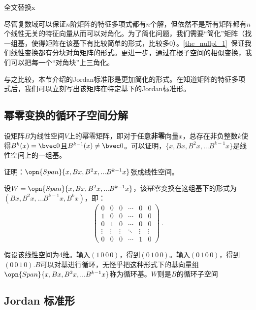 

\begin{issues}
\issueDraft 全文替换x
\end{issues}
尽管复数域可以保证$n$阶矩阵的特征多项式都有$n$个解，但依然不是所有矩阵都有$n$个线性无关的特征向量从而可以对角化。为了简化问题，我们需要“简化”矩阵（找一组基，使得矩阵在该基下有比较简单的形式，比较多$0$）。\autoref{the_nullpl_1}~保证我们线性变换都有分块对角矩阵的形式。更进一步，通过在根子空间的相似变换，我们可以把每一个“对角块”上三角化。

与之比较，本节介绍的Jordan标准形是更加简化的形式。在知道矩阵的特征多项式后，我们可以立刻写出该矩阵在特定基下的Jordan标准形。
\subsection{幂零变换的循环子空间分解}
设矩阵$B$为线性空间$V$上的幂零矩阵，即对于任意\textbf{非零}向量$x$，总存在非负整数$k$使得$B^{k}(x)=\bvec 0$且$B^{k-1}(x)\neq \bvec 0$。可以证明，$\{x,Bx,B^2x,...B^{k-1}x\}$是线性空间上的一组基。
\begin{exercise}{}
证明：$\opn{Span}\{x,Bx,B^2x,...B^{k-1}x\}$张成线性空间。
\end{exercise}
设$W=\opn{Span}\{x,Bx,B^2x,...B^{k-1}x\}$，该幂零变换在这组基下的形式为$(Bx,B^2x,...B^{k-1}x,B^kx)$，即：
\begin{equation}
\left(\begin{array}{cccccc}
0 & 0 & 0 & \cdots & 0 & 0 \\
1 & 0 & 0 & \cdots & 0 & 0 \\
0 & 1 & 0 & \cdots & 0 & 0 \\
\vdots & \vdots & \vdots & \ddots & \vdots & \vdots \\
0 & 0 & 0 & \cdots & 1 & 0
\end{array}\right)~.
\end{equation}

假设该线性空间为4维。输入$(1\,0\,0\,0)$，得到$(0\,1\,0\,0)$。输入$(0\,1\,0\,0)$，得到$(0\,0\,1\,0)$.$B$可以对基进行循环，无怪乎把这种形式下的基向量组$\opn{Span}\{x,Bx,B^2x,...B^{k-1}x\}$称为循环基。$W$则是$B$的循环子空间

\subsection{Jordan 标准形}